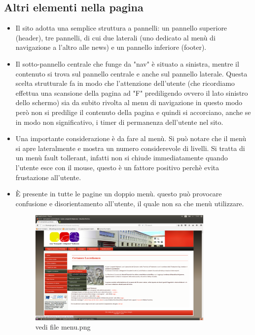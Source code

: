 \documentclass[12pt]{article}
\begin{document}
\newpage
\subsection{Altri elementi nella pagina}
\begin{itemize}
\item Il sito adotta una semplice struttura a pannelli: un pannello superiore (header), tre pannelli, di cui due laterali (uno dedicato al men\`u di navigazione a l'altro alle news) e un pannello inferiore (footer).  

\item Il sotto-pannello centrale che funge da "nav" \`e situato a sinistra, mentre il contenuto si trova sul pannello centrale e anche sul pannello laterale.
 Questa scelta strutturale fa in modo che l'attenzione dell'utente (che ricordiamo effettua una scansione della pagina ad "F" prediligendo ovvero il lato sinistro dello schermo) sia da subito rivolta al menu di navigazione in questo modo per\`o non si predilige il contenuto della pagina e quindi si accorciano, anche se in modo non significativo, i timer di permanenza dell'utente nel sito.

 \item Una importante considerazione \`e  da fare al men\`u. Si pu\`o notare che il men\`u si apre lateralmente e mostra un numero considerevole di livelli. Si tratta di un men\`u fault tollerant, infatti non si chiude immediatamente quando l'utente esce con il mouse, questo \`e  un fattore positivo perch\`e evita frustazione all'utente.

 \item \`E presente in tutte le pagine un doppio men\`u. questo pu\`o provocare confusione e disorientamento all'utente, il quale non sa che men\`u utilizzare.

\begin{figure}[ht!]
\centering
\includegraphics[width=90mm]{menu}
\caption{vedi file menu.png}
\end{figure} 

\end{itemize}
\end{document}
